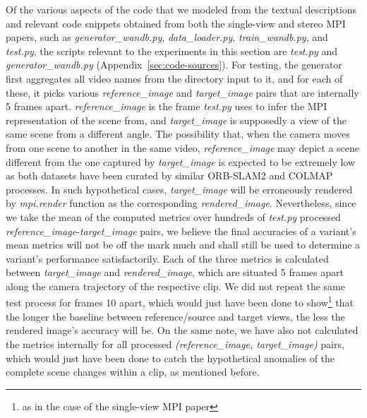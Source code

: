 Of the various aspects of the code that we modeled from the textual descriptions and relevant code snippets obtained from both the single-view and stereo MPI papers, such as \textit{generator\_wandb.py}, \textit{data\_loader.py}, \textit{train\_wandb.py}, and \textit{test.py}, the scripts relevant to the experiments in this section are \textit{test.py} and \textit{generator\_wandb.py} (Appendix~\ref{sec:code-sources}). For testing, the generator first aggregates all video names from the directory input to it, and for each of these, it picks various \textit{reference\_image} and \textit{target\_image} pairs that are internally 5 frames apart. \textit{reference\_image} is the frame \textit{test.py} uses to infer the MPI representation of the scene from, and \textit{target\_image} is supposedly a view of the same scene from a different angle. The possibility that, when the camera moves from one scene to another in the same video, \textit{reference\_image} may depict a scene different from the one captured by \textit{target\_image} is expected to be extremely low as both datasets have been curated by similar ORB-SLAM2 and COLMAP processes. In such hypothetical cases, \textit{target\_image} will be erroneously rendered by \textit{mpi.render} function as the corresponding \textit{rendered\_image}. Nevertheless, since we take the mean of the computed metrics over hundreds of \textit{test.py} processed \textit{reference\_image}-\textit{target\_image} pairs, we believe the final accuracies of a variant's mean metrics will not be off the mark much and shall still be used to determine a variant’s performance satisfactorily. Each of the three metrics is calculated between \textit{target\_image} and \textit{rendered\_image}, which are situated 5 frames apart along the camera trajectory of the respective clip. We did not repeat the same test process for frames 10 apart, which would just have been done to show\footnote{as in the case of the single-view MPI paper} that the longer the baseline between reference/source and target views, the less the rendered image’s accuracy will be. On the same note, we have also not calculated the metrics internally for all processed \textit{(reference\_image, target\_image)} pairs, which would just have been done to catch the hypothetical anomalies of the complete scene changes within a clip, as mentioned before. 

